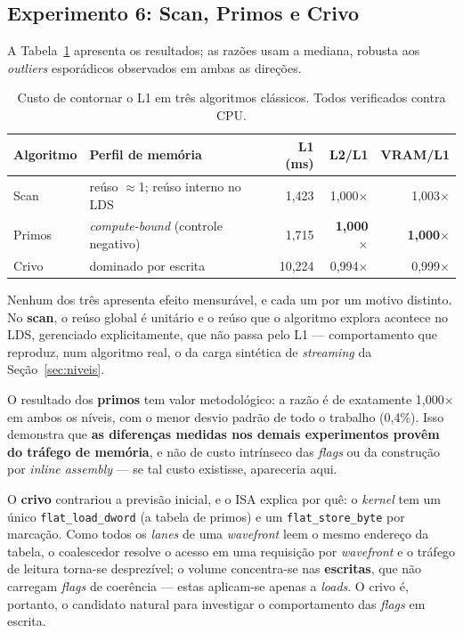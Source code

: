 \subsection{Experimento 6: Scan, Primos e Crivo}

A Tabela~\ref{tab:algoritmos} apresenta os resultados; as razões usam a mediana, robusta aos \textit{outliers} esporádicos observados em ambas as direções.

\begin{table}[ht]
\centering
\caption{Custo de contornar o L1 em três algoritmos clássicos. Todos verificados contra CPU.}
\label{tab:algoritmos}
\small
\begin{tabular}{@{}llrrr@{}}
\toprule
\textbf{Algoritmo} & \textbf{Perfil de memória} & \textbf{L1 (ms)} & \textbf{L2/L1} & \textbf{VRAM/L1} \\
\midrule
Scan & reúso $\approx$1; reúso interno no LDS & 1,423 & 1,000$\times$ & 1,003$\times$ \\
Primos & \textit{compute-bound} (controle negativo) & 1,715 & \textbf{1,000$\times$} & \textbf{1,000$\times$} \\
Crivo & dominado por escrita & 10,224 & 0,994$\times$ & 0,999$\times$ \\
\bottomrule
\end{tabular}
\end{table}

Nenhum dos três apresenta efeito mensurável, e cada um por um motivo distinto. No \textbf{scan}, o reúso global é unitário e o reúso que o algoritmo explora acontece no LDS, gerenciado explicitamente, que não passa pelo L1 --- comportamento que reproduz, num algoritmo real, o da carga sintética de \textit{streaming} da Seção~\ref{sec:niveis}.

O resultado dos \textbf{primos} tem valor metodológico: a razão é de exatamente 1,000$\times$ em ambos os níveis, com o menor desvio padrão de todo o trabalho (0,4\%). Isso demonstra que \textbf{as diferenças medidas nos demais experimentos provêm do tráfego de memória}, e não de custo intrínseco das \textit{flags} ou da construção por \textit{inline assembly} --- se tal custo existisse, apareceria aqui.

O \textbf{crivo} contrariou a previsão inicial, e o ISA explica por quê: o \textit{kernel} tem um único \texttt{flat\_load\_dword} (a tabela de primos) e um \texttt{flat\_store\_byte} por marcação. Como todos os \textit{lanes} de uma \textit{wavefront} leem o mesmo endereço da tabela, o coalescedor resolve o acesso em uma requisição por \textit{wavefront} e o tráfego de leitura torna-se desprezível; o volume concentra-se nas \textbf{escritas}, que não carregam \textit{flags} de coerência --- estas aplicam-se apenas a \textit{loads}. O crivo é, portanto, o candidato natural para investigar o comportamento das \textit{flags} em escrita.


